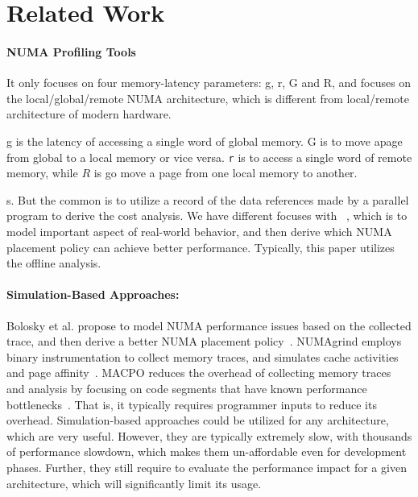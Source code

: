 \section{Related Work}
\label{sec:related}

\paragraph{NUMA Profiling Tools} 


 It only focuses on four memory-latency parameters: g, r, G and R, and focuses on the local/global/remote NUMA architecture, which is different from local/remote architecture of modern hardware. 

g is the latency of accessing a single word of  global memory. G is to move apage from global to a local memory or vice versa. \texttt{r} is to access a single word of remote memory, while  $R$ is go move a page from one local memory to another. 

s. 
But the common is to utilize a record of the data references made by a parallel program to derive the cost analysis. 
We have different focuses with ~\cite{Bolosky:1991:NPR:106972.106994}, which is to model important aspect of real-world behavior, and then derive which NUMA placement policy can achieve better performance. Typically, this paper utilizes the offline analysis.  

\paragraph{Simulation-Based Approaches:}
 Bolosky et al. propose to model NUMA performance issues based on the collected trace, and then derive a better NUMA placement policy~\cite{Bolosky:1991:NPR:106972.106994}.
 NUMAgrind employs binary instrumentation to collect memory traces, and simulates cache activities and page affinity~\cite{NUMAGrind}. MACPO reduces the overhead of collecting memory traces and analysis by focusing on code segments that have known performance bottlenecks~\cite{MACPO}. That is, it typically requires programmer inputs to reduce its overhead.  Simulation-based approaches could be utilized for any architecture, which are very useful. However, they are typically extremely slow, with thousands of performance slowdown, which makes them un-affordable even for development phases. Further, they still require to evaluate the performance impact for a given  architecture, which will significantly limit its usage. 

